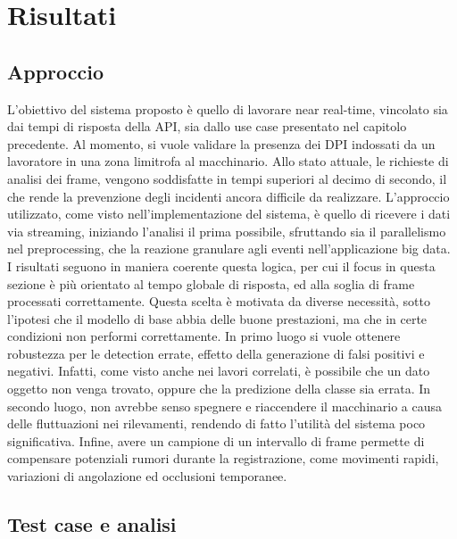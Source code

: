 \chapter{Risultati}

\section{Approccio}
L'obiettivo del sistema proposto è quello di lavorare near real-time, vincolato sia dai tempi di risposta della API, sia dallo use case presentato nel capitolo precedente. Al momento, si vuole validare la presenza dei DPI indossati da un lavoratore in una zona limitrofa al macchinario.%
Allo stato attuale, le richieste di analisi dei frame, vengono soddisfatte in tempi superiori al decimo di secondo, il che rende la prevenzione degli incidenti ancora difficile da realizzare. L'approccio utilizzato, come visto nell'implementazione del sistema, è quello di ricevere i dati via streaming, iniziando l'analisi il prima possibile, sfruttando sia il parallelismo nel preprocessing, che la reazione granulare agli eventi nell'applicazione big data. I risultati seguono in maniera coerente questa logica, per cui il focus in questa sezione è più orientato al tempo globale di risposta, ed alla soglia di frame processati correttamente. Questa scelta è motivata da diverse necessità, sotto l'ipotesi che il modello di base abbia delle buone prestazioni, ma che in certe condizioni non performi correttamente. In primo luogo si vuole ottenere robustezza per le detection errate, effetto della generazione di falsi positivi e negativi. Infatti, come visto anche nei lavori correlati, è possibile che un dato oggetto non venga trovato, oppure che la predizione della classe sia errata. In secondo luogo, non avrebbe senso spegnere e riaccendere il macchinario a causa delle fluttuazioni nei rilevamenti, rendendo di fatto l'utilità del sistema poco significativa. Infine, avere un campione di un intervallo di frame permette di compensare potenziali rumori durante la registrazione, come movimenti rapidi, variazioni di angolazione ed occlusioni temporanee. 



\section{Test case e analisi}

